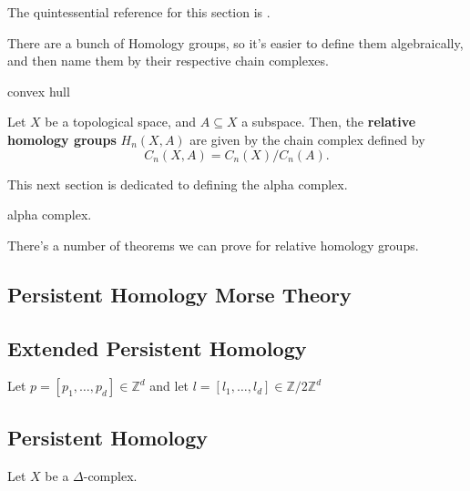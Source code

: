 \documentclass[../main.tex]{subfiles}
\begin{document}
	
	The quintessential reference for this section is \cite{hatcher2002algebraic}. 
	
	
	There are a bunch of Homology groups, so it's easier to define them algebraically, and then name them by their respective chain complexes.
	
	\begin{definition}
		convex hull
	\end{definition}
	
	
	
	\begin{definition}
		Let $X$ be a topological space, and $A\subseteq X$ a subspace. Then, the \textbf{relative homology groups} $H_n(X,A)$ are given by the chain complex defined by 
		$$C_n(X,A)=C_n(X)/C_n(A).$$
	\end{definition}

	
		This next section is dedicated to defining the alpha complex.
		
		\begin{definition}
			
		\end{definition}

	\begin{definition}
		alpha complex. 
	\end{definition}

	
	There's a number of theorems we can prove for relative homology groups.
	
	
	
	\begin{example}
		
	\end{example}
	
	

	
	\subsection{Persistent Homology Morse Theory}
	
	
	
	\subsection{Extended Persistent Homology}
	
		Let $p=[p_1,\ldots, p_d]\in \mathbb{Z}^d$ and let $l=[l_1,\ldots,l_d]\in \mathbb{Z}/2\mathbb{Z}^d$
	
	
	
	
	\subsection{Persistent Homology}
	
		Let $X$ be a $\Delta$-complex. 
		
		
	
	
	
		\ifSubfilesClassLoaded{
			
			
		}{}
	
\end{document}
